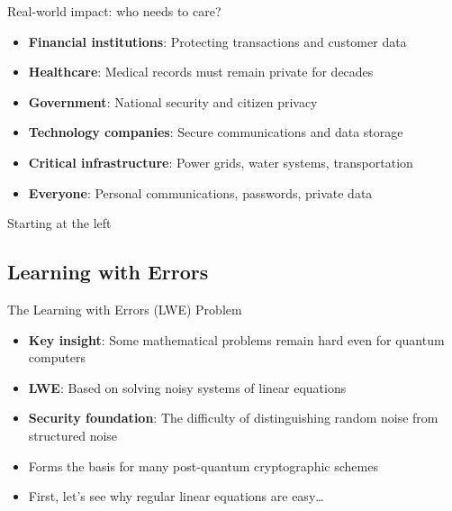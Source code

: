\documentclass[aspectratio=169, lualatex, handout]{beamer}
\begin{document}
\begin{frame}{Real-world impact: who needs to care?}
	\begin{itemize}
		\item \textbf{Financial institutions}: Protecting transactions and customer data
		\item \textbf{Healthcare}: Medical records must remain private for decades
		\item \textbf{Government}: National security and citizen privacy
		\item \textbf{Technology companies}: Secure communications and data storage
		\item \textbf{Critical infrastructure}: Power grids, water systems, transportation
		\item \textbf{Everyone}: Personal communications, passwords, private data
	\end{itemize}
\end{frame}

\begin{frame}{Starting at the left}
\end{frame}

\subsection{Learning with Errors}

\begin{frame}{The Learning with Errors (LWE) Problem}
	\begin{itemize}
		\item \textbf{Key insight}: Some mathematical problems remain hard even for quantum computers
		\item \textbf{LWE}: Based on solving noisy systems of linear equations
		\item \textbf{Security foundation}: The difficulty of distinguishing random noise from structured noise
		\item Forms the basis for many post-quantum cryptographic schemes
		\item First, let's see why regular linear equations are easy\ldots
	\end{itemize}
\end{frame}
\end{document}
